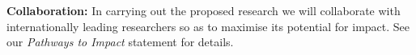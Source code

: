 \documentclass[a4paper,11pt]{article}
\begin{document}
\vspace*{0.02in}

{\bf Collaboration:} In carrying out the proposed research we will
collaborate with internationally leading researchers so as to maximise
its potential for impact. See our {\em Pathways to
  Impact} statement for details.














\end{document}
